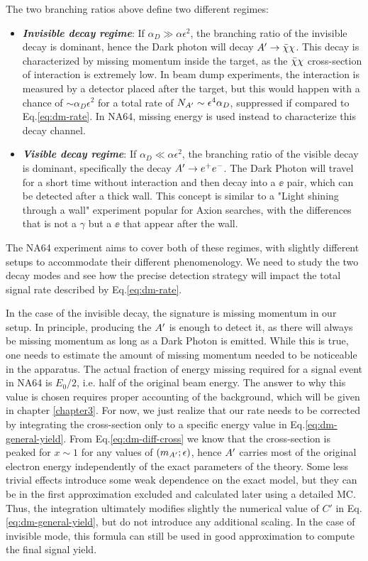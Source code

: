 The two branching ratios above define two different regimes:
\begin{itemize}
\item \textbf{\textit{Invisible decay regime}}: If $\alpha_D \gg \alpha \epsilon^2$, the branching ratio of the invisible decay is dominant, hence the Dark photon will decay $A' \to \bar{\chi} \chi$. This decay is characterized by missing momentum inside the target, as the $\bar{\chi} \chi$ cross-section of interaction is extremely low. In beam dump experiments, the interaction is measured by a detector placed after the target, but this would happen with a chance of $\sim \alpha_D \epsilon^2$ for a total rate of $N_{A'} \sim \epsilon^4 \alpha_D$, suppressed if compared to Eq.\ref{eq:dm-rate}. In NA64, missing energy is used instead to characterize this decay channel. 
\item \textbf{\textit{Visible decay regime}}: If $\alpha_D \ll \alpha \epsilon^2$, the branching ratio of the visible decay is dominant, specifically the decay $A' \to e^+e^-$. The Dark Photon will travel for a short time without interaction and then decay into a $\ee$ pair, which can be detected after a thick wall. This concept is similar to a "Light shining through a wall" experiment popular for Axion searches, with the differences that is not a $\gamma$ but a $\ee$ that appear after the wall.
\end{itemize}

The NA64 experiment aims to cover both of these regimes, with slightly different setups to accommodate their different phenomenology. We need to study the two decay modes and see how the precise detection strategy will impact the total signal rate described by Eq.\ref{eq:dm-rate}.

In the case of the invisible decay, the signature is missing momentum in our setup. In principle, producing the $A'$ is enough to detect it, as there will always be missing momentum as long as a Dark Photon is emitted. While this is true, one needs to estimate the amount of missing momentum needed to be noticeable in the apparatus. The actual fraction of energy missing required for a signal event in NA64 is $E_0/2$, i.e. half of the original beam energy. The answer to why this value is chosen requires proper accounting of the background, which will be given in chapter \ref{chapter3}.  For now, we just realize that our rate needs to be corrected by integrating the cross-section only to a specific energy value in Eq.\ref{eq:dm-general-yield}. From Eq.\ref{eq:dm-diff-cross} we know that the cross-section is peaked for $x \sim 1$ for any values of $(m_{A'};\epsilon)$, hence $A'$ carries most of the original electron energy independently of the exact parameters of the theory. Some less trivial effects introduce some weak dependence on the exact model, but they can be in the first approximation excluded and calculated later using a detailed MC. Thus, the integration ultimately modifies slightly the numerical value of $C'$ in Eq.\ref{eq:dm-general-yield}, but do not introduce any additional scaling. In the case of invisible mode, this formula can still be used in good approximation to compute the final signal yield.

